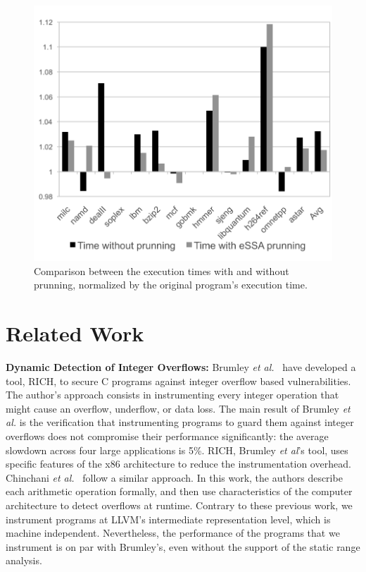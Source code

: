 \documentclass[preprint]{sigplanconf}[10pt]
\begin{document}
\begin{figure}[t!]
\begin{center}
\includegraphics[width=\columnwidth]{images/spec_runtime}
\end{center}
\caption{\label{fig:spec_runtime}
Comparison between the execution times with and without prunning, 
normalized by the original program's execution time.}
\end{figure}


\section{Related Work}
\label{sec:rel}

\noindent
\textbf{Dynamic Detection of Integer Overflows: }
Brumley {\em et al.}~\cite{Brumley07} have developed a tool, RICH, to
secure C programs against integer overflow based vulnerabilities.
The author's approach consists in instrumenting every integer operation that
might cause an overflow, underflow, or data loss.
The main result of Brumley {\em et al.} is the verification that instrumenting
programs to guard them against integer overflows does not compromise their
performance significantly: the average slowdown across four large applications
is 5\%.
RICH, Brumley {\em et al}'s tool, uses specific features of the x86 architecture
to reduce the instrumentation overhead.
Chinchani {\em et al.}~\cite{Chinchani04} follow a similar approach.
In this work, the authors describe each arithmetic operation formally, and then
use characteristics of the computer architecture to detect overflows at
runtime.
Contrary to these previous work, we instrument programs at LLVM's intermediate
representation level, which is machine independent.
Nevertheless, the performance of the programs that we instrument is on par with
Brumley's, even without the support of the static range analysis.
\end{document}
